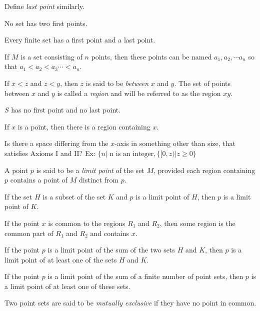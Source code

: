 \documentclass{article}
\begin{document}
\begin{description}
     Define \emph{last point} similarly.
  \item[Theorem 2:] No set has two first points.
  \item[Theorem 3:] Every finite set has a first point and a last point.
  \item[Theorem 4:] If $M$ is a set consisting of $n$ points, then these points can be named $a_{1}, a_{2}, \cdots a_{n}$ so that $a_{1} < a_{2} < a_{3} \cdots < a_{n}$.
  \item[Definition:] If $x<z$ and $z<y$, then $z$ is said to be \emph{between} $x$ and $y$. The set of points between $x$ and $y$ is called a \emph{region} and will be referred to as the region $xy$.
  \item[Axiom II:] $S$ has no first point and no last point.
  \item[Theorem 5:] If $x$ is a point, then there is a region containing $x$.
  \item[Question:] Is there a space differing from the $x$-axis in something other than size, that satisfies Axioms I and II? Ex: $\{ n| \text{ n is an integer}, \{ [0,z) | z \geq 0 \}$
  \item[Definition:] A point $p$ is said to be a \emph{limit point} of the set $M$, provided each region containing $p$ contains a point of $M$ distinct from $p$.
  \item[Theorem 6:] If the set $H$ is a subset of the set $K$ and $p$ is a limit point of $H$, then $p$ is a limit point of $K$.
  \item[Theorem 7:] If the point $x$ is common to the regions $R_{1}$ and $R_{2}$, then some region is the common part of $R_{1}$ and $R_{2}$ and contains $x$.
  \item[Theorem 8:] If the point $p$ is a limit point of the sum of the two sets $H$ and $K$, then $p$ is a limit point of at least one of the sets $H$ and $K$.
  \item[Theorem 9:] If the point $p$ is a limit point of the sum of a finite number of point sets, then $p$ is a limit point of at least one of these sets.
  \item[Definitions:] Two point sets are said to be \emph{mutually exclusive} if they have no point in common.


\end{description}
\end{document}
